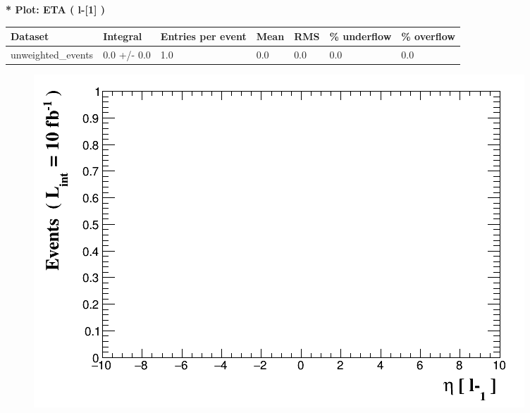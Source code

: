 \documentclass[a4paper, 10pt]{article}
\begin{document}
\textbf{* Plot: ETA ( l-[1] ) }\\
   \begin{table}[H]
  \begin{center}
    \begin{tabular}{|m{23.0mm}|m{23.0mm}|m{18.0mm}|m{19.0mm}|m{19.0mm}|m{19.0mm}|m{19.0mm}|}
      \hline
      {\cellcolor{yellow}         Dataset}& {\cellcolor{yellow}         Integral}& {\cellcolor{yellow}         Entries per event}& {\cellcolor{yellow}         Mean}& {\cellcolor{yellow}         RMS}& {\cellcolor{yellow}         \% underflow}& {\cellcolor{yellow}         \% overflow}\\
      \hline
      {\cellcolor{white}         unweighted\_events}& {\cellcolor{white}         0.0 +/\-- 0.0}& {\cellcolor{white}         1.0}& {\cellcolor{white}         0.0}& {\cellcolor{white}         0.0}& {\cellcolor{green}         0.0}& {\cellcolor{green}         0.0}\\
\hline
    \end{tabular}
  \end{center}
\end{table}

\begin{figure}[H]
  \begin{center}
    \includegraphics[scale=0.45]{selection_6.png}\\
\caption{   }
  \end{center}
\end{figure}
      
\end{document}
